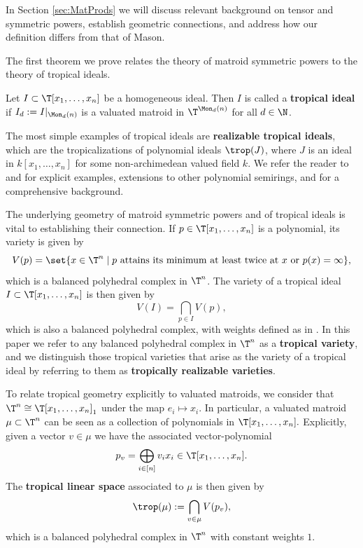 In Section \ref{sec:MatProds} we will discuss relevant background on tensor and symmetric powers, establish geometric connections, and address how our definition differs from that of Mason.

The first theorem we prove relates the theory of matroid symmetric powers to the theory of tropical ideals.

\begin{definition}\label{def:tropicalIdeals}
    Let $I\subset \T[x_1,\dots,x_n]$ be a homogeneous ideal. Then $I$ is called a \textbf{tropical ideal} if $I_d:=I|_{\Mon_d(n)}$ is a valuated matroid in $\T^{\Mon_d(n)}$ for all $d\in \N$. 
\end{definition}

The most simple examples of tropical ideals are \textbf{realizable tropical ideals}, which are the tropicalizations of polynomial ideals $\trop(J)$, where $J$ is an ideal in $k[x_1,\dots,x_n]$ for some non-archimedean valued field $k$. We refer the reader to \cite{MR18} and \cite{MR20} for explicit examples, extensions to other polynomial semirings, and for a comprehensive background.

The underlying geometry of matroid symmetric powers and of tropical ideals is vital to establishing their connection. If $p\in \T[x_1,\dots,x_n]$ is a polynomial, its variety is given by
$$V(p)=\set{x\in \T^n\mid p \text{ attains its minimum at least twice at } x \text{ or } p(x)=\infty},$$
which is a balanced polyhedral complex in $\T^n$. The variety of a tropical ideal $I\subset \T[x_1,\dots,x_n]$ is then given by
$$V(I)=\bigcap_{p\in I}V(p),$$
which is also a balanced polyhedral complex, with weights defined as in \cite{MR20}. In this paper we refer to any balanced polyhedral complex in $\T^n$ as a \textbf{tropical variety}, and we distinguish those tropical varieties that arise as the variety of a tropical ideal by referring to them as \textbf{tropically realizable varieties}. 


To relate tropical geometry explicitly to valuated matroids, we consider that $\T^n\cong \T[x_1,\dots,x_n]_1$ under the map $e_i\mapsto x_i$. In particular, a valuated matroid $\mu\subset \T^n$ can be seen as a collection of polynomials in $\T[x_1,\dots,x_n].$ Explicitly, given a vector $v\in \mu$ we have the associated vector-polynomial
$$p_v = \bigoplus_{i\in [n]} v_ix_i\in \T[x_1,\dots,x_n].$$
The \textbf{tropical linear space} associated to $\mu$ is then given by
$$\trop(\mu) := \bigcap_{v\in \mu}V(p_v),$$
which is a balanced polyhedral complex in $\T^n$ with constant weights $1$.

